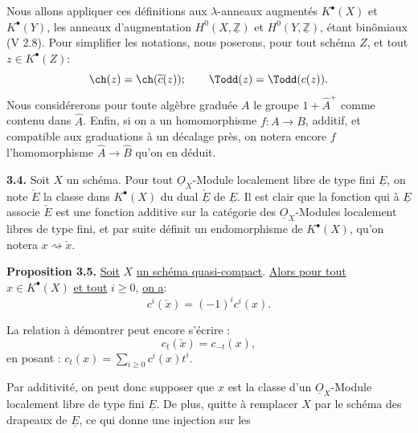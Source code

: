 

Nous allons appliquer ces définitions aux $\lambda$-anneaux augmentés $K^{\bullet}(X)$ et $K^{\bullet}(Y)$, les anneaux d'augmentation $H^0(X,\underline{\mathbb Z})$ et $H^0(Y,\underline{\mathbb Z})$, étant binômiaux (V 2.8). Pour simplifier les notations, nous poserons, pour tout schéma $Z$, et tout $z\in K^{\bullet}(Z)$:
\[
\ch(z)=\ch(\widetilde c(z));
\qquad
\Todd(z)=\Todd(c(z)).
\]
Nous considérerons pour toute algèbre graduée $A$ le groupe $1+\widehat A^+$ comme contenu dans $\widehat A$. Enfin, si on a un homomorphisme $f:A\to B$, additif, et compatible aux graduations à un décalage près, on notera encore $f$ l'homomorphisme $\widehat A\to\widehat B$ qu'on en déduit.

\textbf{3.4.} Soit $X$ un schéma. Pour tout $\underline{O}_X$-Module localement libre de type fini $\underline{E}$, on note $\check E$ la classe dans $K^{\bullet}(X)$ du dual $\underline{\check E}$ de $\underline{E}$. Il est clair que la fonction qui à $\underline{E}$ associe $\check E$ est une fonction additive sur la catégorie des $\underline{O}_X$-Modules localement libres de type fini, et par suite définit un endomorphisme de $K^{\bullet}(X)$, qu'on notera $x\rightsquigarrow\check x$.

\textbf{Proposition 3.5.} \uline{Soit} $X$ \uline{un schéma quasi-compact}. \uline{Alors pour tout} $x\in K^{\bullet}(X)$ \uline{et tout} $i\geq0$, \uline{on a}:
\[
c^i(\check x)=(-1)^i c^i(x).
\]

La relation à démontrer peut encore s'écrire :
\[
c_t(\check x)=c_{-t}(x),
\]
en posant : $c_t(x)=\sum_{i\geq0}c^i(x)t^i$.

Par additivité, on peut donc supposer que $x$ est la classe d'un $\underline{O}_X$-Module localement libre de type fini $\underline{E}$. De plus, quitte à remplacer $X$ par le schéma des drapeaux de $\underline{E}$, ce qui donne une injection sur les
